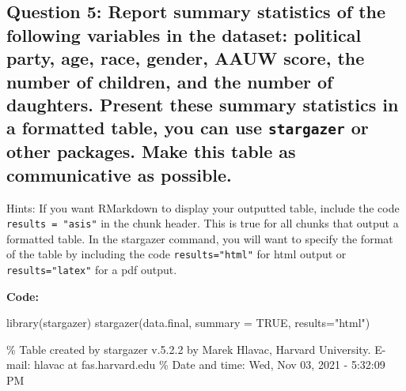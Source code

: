 \documentclass[
]{article}
\newenvironment{Shaded}{\begin{snugshade}}{\end{snugshade}}
\newcommand{\AttributeTok}[1]{\textcolor[rgb]{0.77,0.63,0.00}{#1}}
\newcommand{\ConstantTok}[1]{\textcolor[rgb]{0.00,0.00,0.00}{#1}}
\newcommand{\FunctionTok}[1]{\textcolor[rgb]{0.00,0.00,0.00}{#1}}
\newcommand{\NormalTok}[1]{#1}
\newcommand{\StringTok}[1]{\textcolor[rgb]{0.31,0.60,0.02}{#1}}
\begin{document}
\hypertarget{question-5-report-summary-statistics-of-the-following-variables-in-the-dataset-political-party-age-race-gender-aauw-score-the-number-of-children-and-the-number-of-daughters.-present-these-summary-statistics-in-a-formatted-table-you-can-use-stargazer-or-other-packages.-make-this-table-as-communicative-as-possible.}{%
\subsection{\texorpdfstring{Question 5: Report summary statistics of the
following variables in the dataset: political party, age, race, gender,
AAUW score, the number of children, and the number of daughters. Present
these summary statistics in a formatted table, you can use
\texttt{stargazer} or other packages. Make this table as communicative
as
possible.}{Question 5: Report summary statistics of the following variables in the dataset: political party, age, race, gender, AAUW score, the number of children, and the number of daughters. Present these summary statistics in a formatted table, you can use stargazer or other packages. Make this table as communicative as possible.}}\label{question-5-report-summary-statistics-of-the-following-variables-in-the-dataset-political-party-age-race-gender-aauw-score-the-number-of-children-and-the-number-of-daughters.-present-these-summary-statistics-in-a-formatted-table-you-can-use-stargazer-or-other-packages.-make-this-table-as-communicative-as-possible.}}

Hints: If you want RMarkdown to display your outputted table, include
the code \texttt{results\ =\ "asis"} in the chunk header. This is true
for all chunks that output a formatted table. In the stargazer command,
you will want to specify the format of the table by including the code
\texttt{results="html"} for html output or \texttt{results="latex"} for
a pdf output.

\textbf{Code:}

\begin{Shaded}
\begin{Highlighting}[]
\FunctionTok{library}\NormalTok{(stargazer)}
\FunctionTok{stargazer}\NormalTok{(data.final, }\AttributeTok{summary =} \ConstantTok{TRUE}\NormalTok{, }\AttributeTok{results=}\StringTok{"html"}\NormalTok{)}
\end{Highlighting}
\end{Shaded}

\% Table created by stargazer v.5.2.2 by Marek Hlavac, Harvard
University. E-mail: hlavac at fas.harvard.edu \% Date and time: Wed, Nov
03, 2021 - 5:32:09 PM
\end{document}
